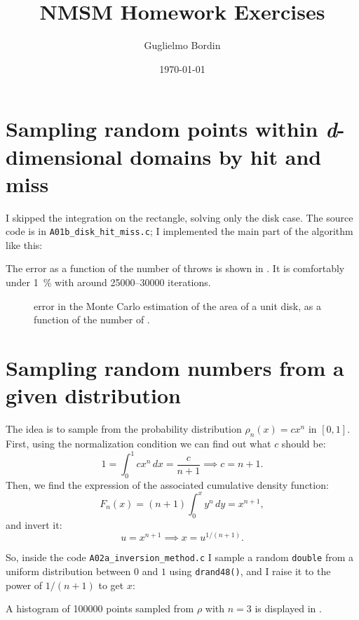 \documentclass{gulartcl}
\title{NMSM Homework Exercises}
\author{Guglielmo Bordin}
\date{\today}
\begin{document}
\maketitle
\section{Sampling random points within \emph{d}-dimensional domains by hit and
miss}
I skipped the integration on the rectangle, solving only the disk case.  The
source code is in \texttt{A01b\_disk\_hit\_miss.c}; I implemented the main part
of the algorithm like this:

The error as a function of the number of throws is shown in .
It is comfortably under \qty{1}{\percent} with around \numrange{25000}{30000}
iterations.

\begin{figure}
    \centering
    
    \caption{error in the Monte Carlo estimation of the area of a unit
        disk, as a function of the number of .}
    \label{fig:A01b}
\end{figure}

\section{Sampling random numbers from a given distribution}
The idea is to sample from the probability distribution $\rho_n(x) = c x^n$ in
$[0, 1]$.  First, using the normalization condition we can find out what $c$
should be:
\begin{equation}
    1 = \int_{0}^{1} cx^n \, dx = \frac{c}{n + 1} \implies c = n + 1.
\end{equation}
Then, we find the expression of the associated cumulative density function:
\begin{equation}
    F_n(x) = (n + 1) \int_{0}^{x} y^n \, dy = x^{n + 1},
\end{equation}
and invert it:
\begin{equation}
    u = x^{n + 1} \implies x = u^{1 / (n + 1)}.
\end{equation}

So, inside the code \texttt{A02a\_inversion\_method.c} I sample a random
\texttt{double} from a uniform distribution between $0$ and $1$ using
\texttt{drand48()}, and I raise it to the power of $1 / (n + 1)$ to get $x$:

A histogram of \num{100000} points sampled from $\rho$ with $n = 3$ is displayed
in .
\end{document}
